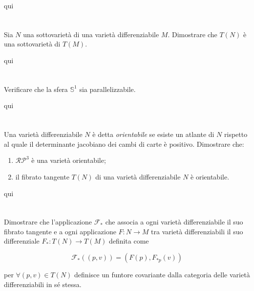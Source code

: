 qui




\tocless\section{}\label{es2-25}

\begin{tcolorbox}
	Sia $ N $ una sottovarietà di una varietà differenziabile $ M $. Dimostrare che $ T(N) $ è una sottovarietà di $ T(M) $.
\end{tcolorbox}

qui

\tocless\section{}\label{BONUS2-4}

\begin{tcolorbox}
	Verificare che la sfera $ \mathbb{S}^{1} $ sia parallelizzabile.
\end{tcolorbox}

qui

\tocless\section{}\label{es2-26}

\begin{tcolorbox}
	Una varietà differenziabile $ N $ è detta \textit{orientabile} se esiste un atlante di $ N $ rispetto al quale il determinante jacobiano dei cambi di carte è positivo. Dimostrare che:
	
	\begin{enumerate}
		\item $ \mathcal{RP}^{3} $ è una varietà orientabile;
		\item il fibrato tangente $ T(N) $ di una varietà differenziabile $ N $ è orientabile.
	\end{enumerate}
\end{tcolorbox}

qui

\tocless\section{}\label{es2-27}

\begin{tcolorbox}
	Dimostrare che l'applicazione $ \mathcal{F}_{*} $ che associa a ogni varietà differenziabile il suo fibrato tangente e a ogni applicazione $ F : N \to M $ tra varietà differenziabili il suo differenziale $ F_{*} : T(N) \to T(M) $ definita come
	
	\begin{equation}
		\mathcal{F}_{*}((p,v)) = (F(p), F_{*p}(v))
	\end{equation}

	per $ \forall (p,v) \in T(N) $ definisce un funtore covariante dalla categoria delle varietà differenziabili in sé stessa.
\end{tcolorbox}

